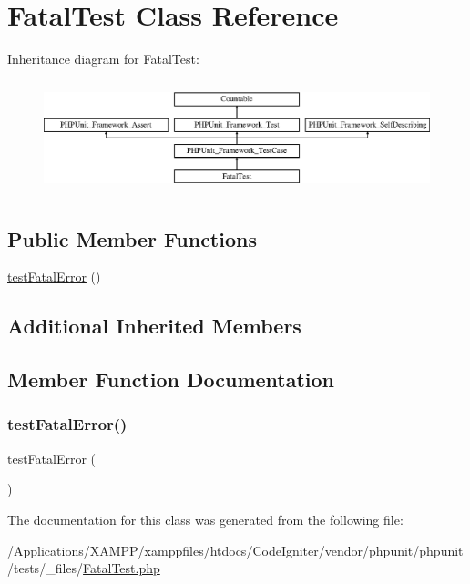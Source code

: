 \hypertarget{class_fatal_test}{}\section{Fatal\+Test Class Reference}
\label{class_fatal_test}
Inheritance diagram for Fatal\+Test\+:\begin{figure}[H]
\begin{center}
\leavevmode
\includegraphics[height=3.303835cm]{class_fatal_test}
\end{center}
\end{figure}
\subsection*{Public Member Functions}
\begin{DoxyCompactItemize}
\item 
\mbox{\hyperlink{class_fatal_test_a267da52269618f3bf82932e7925b76a5}{test\+Fatal\+Error}} ()
\end{DoxyCompactItemize}
\subsection*{Additional Inherited Members}


\subsection{Member Function Documentation}
\mbox{\label{class_fatal_test_a267da52269618f3bf82932e7925b76a5}} 
\subsubsection{\texorpdfstring{test\+Fatal\+Error()}{testFatalError()}}
{\footnotesize\ttfamily test\+Fatal\+Error (\begin{DoxyParamCaption}{ }\end{DoxyParamCaption})}



The documentation for this class was generated from the following file\+:\begin{DoxyCompactItemize}
\item 
/\+Applications/\+X\+A\+M\+P\+P/xamppfiles/htdocs/\+Code\+Igniter/vendor/phpunit/phpunit/tests/\+\_\+files/\mbox{\hyperlink{_fatal_test_8php}{Fatal\+Test.\+php}}\end{DoxyCompactItemize}
